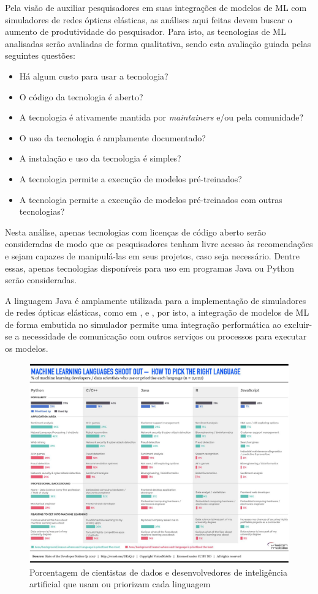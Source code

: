 Pela visão de auxiliar pesquisadores em suas integrações de modelos de ML com simuladores de redes ópticas elásticas, as análises aqui feitas devem buscar o aumento de produtividade do pesquisador. Para isto, as tecnologias de ML analisadas serão avaliadas de forma qualitativa, sendo esta avaliação guiada pelas seguintes questões:

\begin{itemize}
  \item Há algum custo para usar a tecnologia?
  \item O código da tecnologia é aberto?
  \item A tecnologia é ativamente mantida por \textit{maintainers} e/ou pela comunidade?
  \item O uso da tecnologia é amplamente documentado?
  \item A instalação e uso da tecnologia é simples?
  \item A tecnologia permite a execução de modelos pré-treinados?
  \item A tecnologia permite a execução de modelos pré-treinados com outras tecnologias?
\end{itemize}

Nesta análise, apenas tecnologias com licenças de código aberto serão consideradas de modo que os pesquisadores tenham livre acesso às recomendações e sejam capazes de manipulá-las em seus projetos, caso seja necessário. Dentre essas, apenas tecnologias disponíveis para uso em programas Java ou Python serão consideradas.

A linguagem Java é amplamente utilizada para a implementação de simuladores de redes ópticas elásticas, como em \cite{costa2016ons}, \cite{ceons2015} e \cite{net2plan}, por isto, a integração de modelos de ML de forma embutida no simulador permite uma integração performática ao excluir-se a necessidade de comunicação com outros serviços ou processos para executar os modelos.

\begin{figure}[h]
  \centering
  \includegraphics[width=1\textwidth]{img/languages-ml.png}
  \caption{Porcentagem de cientistas de dados e desenvolvedores de inteligência artificial que usam ou priorizam cada linguagem \cite{developer_nation_q1_2017}}
  \label{fig:languagesml}
\end{figure}

